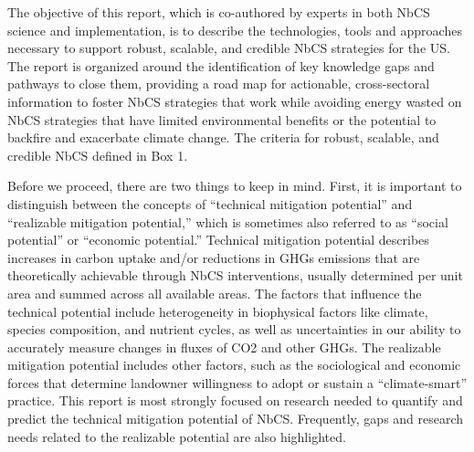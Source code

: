 \documentclass[
  letterpaper,
  DIV=11,
  numbers=noendperiod]{scrreprt}
\begin{document}
The objective of this report, which is co-authored by experts in both
NbCS science and implementation, is to describe the technologies, tools
and approaches necessary to support robust, scalable, and credible NbCS
strategies for the US. The report is organized around the identification
of key knowledge gaps and pathways to close them, providing a road map
for actionable, cross-sectoral information to foster NbCS strategies
that work while avoiding energy wasted on NbCS strategies that have
limited environmental benefits or the potential to backfire and
exacerbate climate change. The criteria for robust, scalable, and
credible NbCS defined in Box 1.

Before we proceed, there are two things to keep in mind. First, it is
important to distinguish between the concepts of ``technical mitigation
potential'' and ``realizable mitigation potential,'' which is sometimes
also referred to as ``social potential'' or ``economic potential.''
Technical mitigation potential describes increases in carbon uptake
and/or reductions in GHGs emissions that are theoretically achievable
through NbCS interventions, usually determined per unit area and summed
across all available areas. The factors that influence the technical
potential include heterogeneity in biophysical factors like climate,
species composition, and nutrient cycles, as well as uncertainties in
our ability to accurately measure changes in fluxes of CO2 and other
GHGs. The realizable mitigation potential includes other factors, such
as the sociological and economic forces that determine landowner
willingness to adopt or sustain a ``climate-smart'' practice. This
report is most strongly focused on research needed to quantify and
predict the technical mitigation potential of NbCS. Frequently, gaps and
research needs related to the realizable potential are also highlighted.
\end{document}
